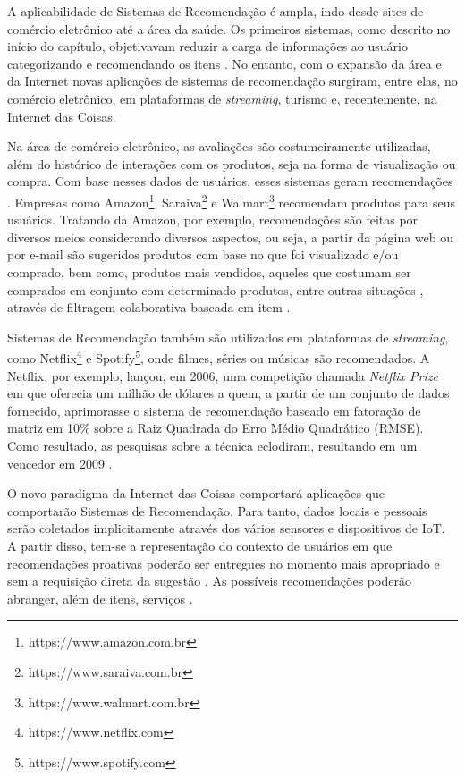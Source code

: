 
A aplicabilidade de Sistemas de Recomendação é ampla, indo desde sites de comércio eletrônico até a área da saúde. Os primeiros sistemas, como descrito no início do capítulo, objetivavam reduzir a carga de informações ao usuário categorizando e recomendando os itens \cite{Goldberg1992, Resnick1994}. No entanto, com o expansão da área e  da Internet novas aplicações de sistemas de recomendação surgiram, entre elas, no comércio eletrônico, em plataformas de \textit{streaming}, turismo e, recentemente, na Internet das Coisas. 

Na área de comércio eletrônico, as avaliações são costumeiramente utilizadas, além do histórico de interações com os produtos, seja na forma de visualização ou compra. Com base nesses dados de usuários, esses sistemas geram recomendações  \cite{Lu2015}. Empresas como Amazon\textsuperscript{\textregistered}\footnote{https://www.amazon.com.br}, Saraiva\textsuperscript{\textregistered}\footnote{https://www.saraiva.com.br} e Walmart\textsuperscript{\textregistered}\footnote{https://www.walmart.com.br} recomendam produtos para seus usuários. Tratando da Amazon, por exemplo, recomendações são feitas por diversos meios considerando diversos aspectos, ou seja, a partir da página web ou por e-mail são sugeridos produtos com base no que foi visualizado e/ou comprado, bem como, produtos mais vendidos, aqueles que costumam ser comprados em conjunto com determinado produtos, entre outras situações \cite{Krawiec2016}, através de filtragem colaborativa baseada em item \cite{Smith2017}.


Sistemas de Recomendação também são utilizados em plataformas de \textit{streaming}, como Netflix\textsuperscript{\textregistered}\footnote{https://www.netflix.com} e Spotify\textsuperscript{\textregistered}\footnote{https://www.spotify.com}, onde filmes, séries ou músicas são recomendados. A Netflix\textsuperscript{\textregistered}, por exemplo, lançou, em 2006, uma competição chamada \textit{Netflix Prize} em que oferecia um milhão de dólares a quem, a partir de um conjunto de dados fornecido, aprimorasse o sistema de recomendação baseado em fatoração de matriz em 10\% sobre a Raiz Quadrada do Erro Médio Quadrático (RMSE). Como resultado, as pesquisas sobre a técnica eclodiram, resultando em um vencedor em 2009 \cite{Jannach2016}.


O novo paradigma da Internet das Coisas comportará aplicações que comportarão  Sistemas de Recomendação. Para tanto, dados locais e pessoais serão coletados implicitamente através dos vários sensores e dispositivos de IoT. A partir disso, tem-se a representação do contexto de usuários em que recomendações proativas poderão ser entregues no momento mais apropriado e sem a requisição direta da sugestão \cite{Salman2015}. As possíveis recomendações poderão abranger, além de itens, serviços \cite {Mashal2015}.


